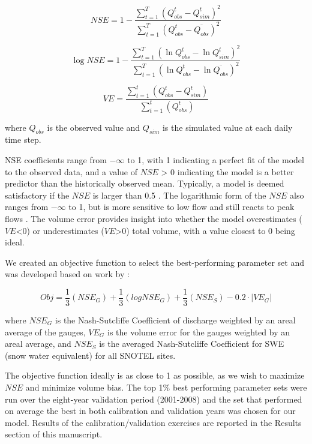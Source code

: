 \documentclass[11pt,letterpaper]{article}
\begin{document}
\begin{equation}
NSE = 1 - \frac{\sum_{t=1}^{T} \left(Q_{obs}^t - Q_{sim}^t\right)^2}{\sum_{t=1}^{T} \left(Q_{obs}^t - \overline{Q_{obs}}\right)^2}
\end{equation}

\begin{equation}
\log NSE = 1 - \frac{\sum_{t=1}^{T} \left(\ln{Q_{obs}^t} - \ln{Q_{sim}^t}\right)^2}{\sum_{t=1}^{T} \left(\ln{Q_{obs}^t} - \ln{\overline{Q_{obs}}}\right)^2}
\end{equation}

\begin{equation}
VE = \frac{\sum_{t=1}^{t} \left(Q_{obs}^t - Q_{sim}^t\right)}{\sum_{t=1}^{t} \left(Q_{obs}^t\right)}
\end{equation}

where $Q_{obs}$ is the observed value and $Q_{sim}$ is the simulated value at each daily time step.

NSE coefficients range from $-\infty$ to 1, with 1 indicating a perfect fit of the model to the observed data, and a value of $NSE$ > 0 indicating the model is a better predictor than the historically observed mean. Typically, a model is deemed satisfactory if the $NSE$ is larger than 0.5 \citep{NMoriasi:2007tj}. The logarithmic form of the $NSE$ also ranges from $-\infty$ to 1, but is more sensitive to low flow and still reacts to peak flows \citep{krause:hal-00296842}. The volume error provides insight into whether the model overestimates ($VE$<0) or underestimates ($VE$>0) total volume, with a value closest to 0 being ideal.

We created an objective function to select the best-performing parameter set and was developed based on work by \citep{Inouye:2014ws}:

\begin{equation}
Obj = \frac{1}{3}\left(NSE_G\right) + \frac{1}{3}\left(logNSE_G\right) + \frac{1}{3}\left(NSE_S\right) - 0.2\cdot\left|VE_G\right|
\end{equation}

where $NSE_G$ is the Nash-Sutcliffe Coefficient of discharge weighted by an areal average of the gauges, $VE_G$  is the volume error for the gauges weighted by an areal average, and $NSE_S$ is the averaged Nash-Sutcliffe Coefficient for SWE (snow water equivalent) for all SNOTEL sites. 

The objective function ideally is as close to 1 as possible, as we wish to maximize $NSE$ and minimize volume bias. The top 1\% best performing parameter sets were run over the eight-year validation period (2001-2008) and the set that performed on average the best in both calibration and validation years was chosen for our model. Results of the calibration/validation exercises are reported in the Results section of this manuscript.
\end{document}

